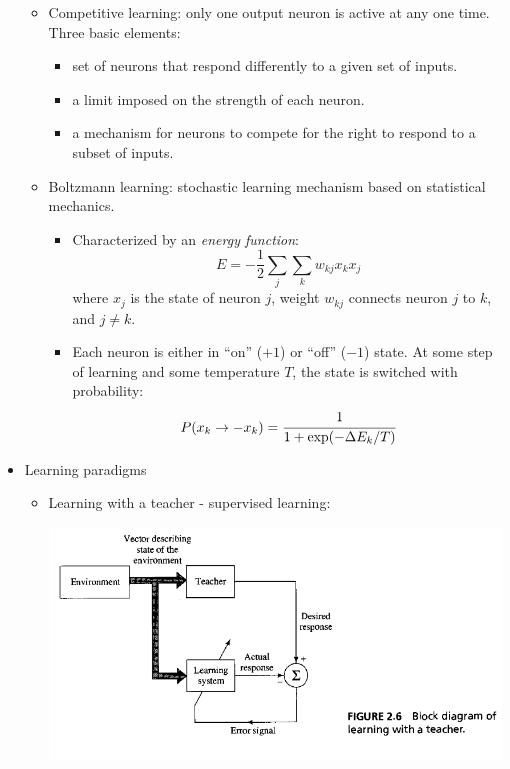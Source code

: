 \documentclass[paper=a4, fontsize=11pt]{scrartcl} %
\begin{document}
\begin{itemize}
\begin{itemize}
            \item Competitive learning: only one output neuron is active at any one time. Three basic elements:
            \begin{itemize}
                \item set of neurons that respond differently to a given set of inputs.
                \item a limit imposed on the strength of each neuron.
                \item a mechanism for neurons to compete for the right to respond to a subset of inputs.
            \end{itemize}

            \item Boltzmann learning: stochastic learning mechanism based on statistical mechanics.
            \begin{itemize}
                \item  Characterized by an \textit{energy function}:
                \[ E = -\frac{1}{2} \sum_{j} \sum_{k} w_{kj} x_k x_j \]
                where $x_j$ is the state of neuron $j$, weight $w_{kj}$ connects neuron $j$ to $k$, and $j \neq k$.
                \item Each neuron is either in ``on'' ($+1$) or ``off'' ($-1$) state. At some step of learning and some temperature $T$, the state is switched with probability:
                \[ P(x_k \rightarrow -x_k) = \cfrac{1}{1 + \exp(-\Delta E_k/T)} \]
            \end{itemize}
        \end{itemize}

        \item Learning paradigms
        \begin{itemize}
            \item Learning with a teacher - supervised learning:
            \begin{center}
                \includegraphics[width=12.0cm]{../images/Haykin-NN-figure2-6.png} %
            \end{center}


\end{itemize}
\end{itemize}
\end{document}
